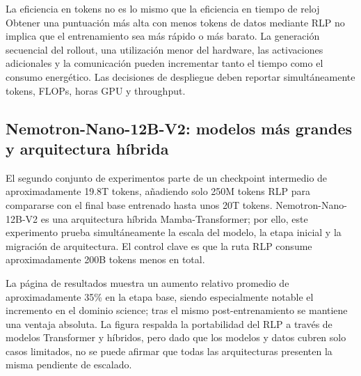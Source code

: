 \begin{warningbox}{La eficiencia en tokens no es lo mismo que la eficiencia en tiempo de reloj}
Obtener una puntuación más alta con menos tokens de datos mediante RLP no implica que el entrenamiento sea más rápido o más barato. La generación secuencial del rollout, una utilización menor del hardware, las activaciones adicionales y la comunicación pueden incrementar tanto el tiempo como el consumo energético. Las decisiones de despliegue deben reportar simultáneamente tokens, FLOPs, horas GPU y throughput.
\end{warningbox}

\subsection{Nemotron-Nano-12B-V2: modelos más grandes y arquitectura híbrida}

El segundo conjunto de experimentos parte de un checkpoint intermedio de aproximadamente 19.8T tokens, añadiendo solo 250M tokens RLP para compararse con el final base entrenado hasta unos 20T tokens. Nemotron-Nano-12B-V2 es una arquitectura híbrida Mamba-Transformer; por ello, este experimento prueba simultáneamente la escala del modelo, la etapa inicial y la migración de arquitectura. El control clave es que la ruta RLP consume aproximadamente 200B tokens menos en total.



La página de resultados muestra un aumento relativo promedio de aproximadamente 35\% en la etapa base, siendo especialmente notable el incremento en el dominio science; tras el mismo post-entrenamiento se mantiene una ventaja absoluta. La figura respalda la portabilidad del RLP a través de modelos Transformer y híbridos, pero dado que los modelos y datos cubren solo casos limitados, no se puede afirmar que todas las arquitecturas presenten la misma pendiente de escalado.


